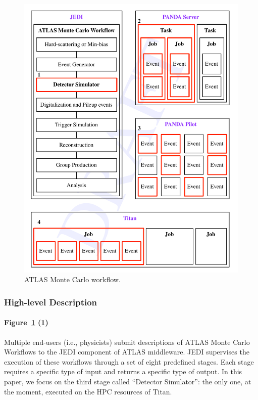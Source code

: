 \begin{figure}
  \includegraphics[width=\columnwidth]{figures/atlas_workflow.pdf}
  \caption{ATLAS Monte Carlo workflow.}
\label{fig:atlas_workflow}
\end{figure}

\subsubsection{High-level Description}

\paragraph{Figure~\ref{fig:atlas_workflow} (1)} Multiple end-users (i.e.,
physicists) submit descriptions of ATLAS Monte Carlo Workflows to the JEDI
component of ATLAS middleware. JEDI supervises the execution of these workflows
through a set of eight predefined stages. Each stage requires a specific type of
input and returns a specific type of output. In this paper, we focus on the
third stage called ``Detector Simulator'': the only one, at the moment, executed
on the HPC resources of Titan.

